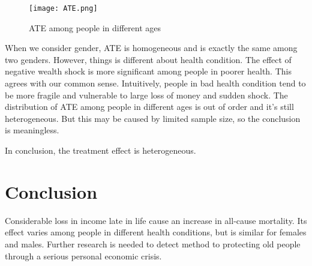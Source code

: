\documentclass[aoas,preprint]{imsart}
\begin{document}
\begin{figure}[!ht]
\centering
\texttt{[image: ATE.png]}
\caption{ATE among people in different ages}
\end{figure}

When we consider gender, ATE is homogeneous and is exactly the same among two genders. However, things is different about health condition. The effect of negative wealth shock is more significant among people in poorer health. This agrees with our common sense. Intuitively, people in bad health condition tend to be more fragile and vulnerable to large loss of money and sudden shock. The distribution of ATE among people in different ages is out of order and it's still heterogeneous. But this may be caused by limited sample size, so the conclusion is meaningless. 

In conclusion, the treatment effect is heterogeneous.



\section{Conclusion}
Considerable loss in income late in life cause an increase in all-cause mortality. Its effect varies among people in different health conditions, but is similar for females and males. Further research is needed to detect method to protecting old people through a serious personal economic crisis.
\end{document}
